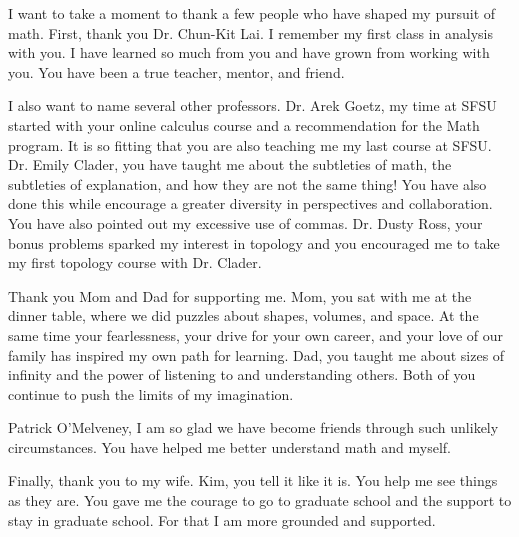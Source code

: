 \documentclass{article}
\begin{document}
I want to take a moment to thank a few people who have shaped my pursuit of math.  First, thank you Dr. Chun-Kit Lai.  I remember my first class in analysis with you.  I have learned so much from you and have grown from working with you.  You have been a true teacher, mentor, and friend.  

I also want to name several other professors.  Dr. Arek Goetz, my time at SFSU started with your online calculus course and a recommendation for the Math program. It is so fitting that you are also teaching me my last course at SFSU.  Dr. Emily Clader, you have taught me about the subtleties of math, the subtleties of explanation, and how they are not the same thing! You have also done this while encourage a greater diversity in perspectives and collaboration.  You have also pointed out my excessive use of commas.  Dr. Dusty Ross, your bonus problems sparked my interest in topology and you encouraged me to take my first topology course with Dr. Clader.  

Thank you Mom and Dad for supporting me.  Mom, you sat with me at the dinner table, where we did puzzles about shapes, volumes, and space.  At the same time your fearlessness, your drive for your own career, and your love of our family has inspired my own path for learning.  Dad, you taught me about sizes of infinity and the power of listening to and understanding others.  Both of you continue to push the limits of my imagination. 


Patrick O'Melveney, I am so glad we have become friends through such unlikely circumstances.  You have helped me better understand math and myself.  

Finally, thank you to my wife.  Kim, you tell it like it is.  You help me see things as they are.  You gave me the courage to go to graduate school and the support to stay in graduate school.  For that I am more grounded and supported. 
\end{document}
